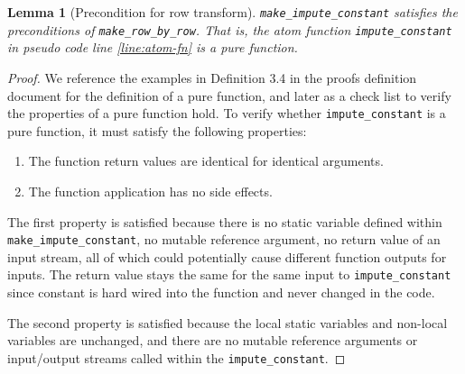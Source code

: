 \documentclass[11pt,a4paper]{article}
\newtheorem{lemma}[theorem]{Lemma}
\begin{document}
\begin{lemma}[Precondition for row transform]\label{lemma:pure-fn}
\texttt{make\_impute\_constant} satisfies the preconditions of \texttt{make\_row\_by\_row}. That is, the atom function \texttt{impute\_constant} in pseudo code line \ref{line:atom-fn} is a pure function. 
\end{lemma}
\begin{proof}
We reference the examples in Definition 3.4 in the proofs definition document for the definition of a pure function, and later as a check list to verify the properties of a pure function hold. To verify whether \texttt{impute\_constant} is a pure function, it must satisfy the following properties:
\begin{enumerate}
    \item The function return values are identical for identical arguments.
    \item The function application has no side effects.
\end{enumerate}

The first property is satisfied because there is no static variable defined within \\\texttt{make\_impute\_constant}, no mutable reference argument, no return value of an input stream, all of which could potentially cause different function outputs for inputs. The return value stays the same for the same input to \texttt{impute\_constant} since constant is hard wired into the function and never changed in the code. 

The second property is satisfied because the local static variables and non-local variables are unchanged, and there are no mutable reference arguments or input/output streams called within the \texttt{impute\_constant}.
\end{proof}
\end{document}
